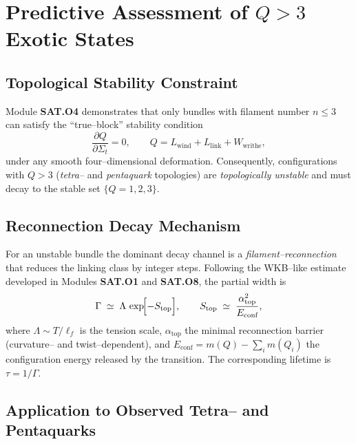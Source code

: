 

\section{Predictive Assessment of $Q>3$ Exotic States}
\label{sec:exotic_predictions}

\subsection{Topological Stability Constraint}

Module \textbf{SAT.O4} demonstrates that only bundles with filament number
$n\le 3$ can satisfy the ``true--block'' stability condition
\[
\frac{\partial Q}{\partial\Sigma_t}=0 ,
\qquad
Q = L_{\text{wind}} + L_{\text{link}} + W_{\text{writhe}},
\]
under any smooth four--dimensional deformation.
Consequently, configurations with $Q>3$ (\emph{tetra--} and \emph{pentaquark}
topologies) are \emph{topologically unstable} and must decay to the
stable set $\{Q=1,2,3\}$.

\subsection{Reconnection Decay Mechanism}

For an unstable bundle the dominant decay channel is a
\emph{filament--reconnection} that reduces the linking class by integer steps.
Following the WKB--like estimate developed in Modules \textbf{SAT.O1} and
\textbf{SAT.O8}, the partial width is
\begin{equation}
  \Gamma \;\simeq\; \Lambda\,\exp\!\Bigl[-S_{\text{top}}\Bigr],
  \qquad
  S_{\text{top}}\;\simeq\;\frac{\alpha_{\text{top}}^{2}}{E_{\text{conf}}},
\label{eq:GammaSAT}
\end{equation}
where $\Lambda\sim T/\ell_f$ is the tension scale,
$\alpha_{\text{top}}$ the minimal reconnection barrier
(curvature-- and twist--dependent), and
$E_{\text{conf}}=m(Q)-\sum_i m(Q_i)$ the configuration energy released by the
transition.  The corresponding lifetime is $\tau=1/\Gamma$.

\subsection{Application to Observed Tetra-- and Pentaquarks}

